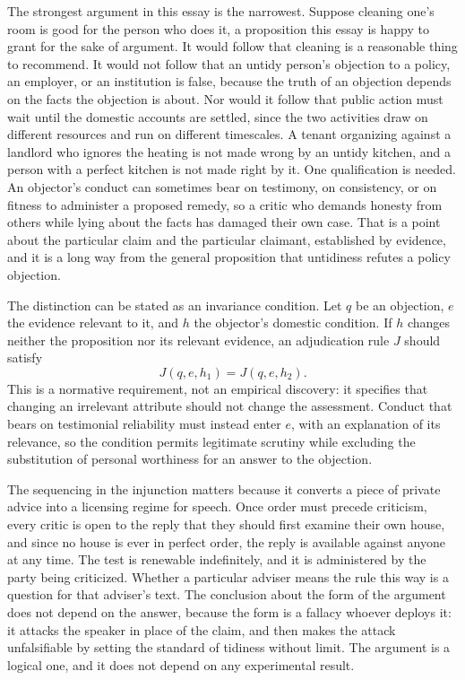 \documentclass[12pt]{article}
\begin{document}
The strongest argument in this essay is the narrowest. Suppose cleaning one's room is good for the person who does it, a proposition this essay is happy to grant for the sake of argument. It would follow that cleaning is a reasonable thing to recommend. It would not follow that an untidy person's objection to a policy, an employer, or an institution is false, because the truth of an objection depends on the facts the objection is about. Nor would it follow that public action must wait until the domestic accounts are settled, since the two activities draw on different resources and run on different timescales. A tenant organizing against a landlord who ignores the heating is not made wrong by an untidy kitchen, and a person with a perfect kitchen is not made right by it. One qualification is needed. An objector's conduct can sometimes bear on testimony, on consistency, or on fitness to administer a proposed remedy, so a critic who demands honesty from others while lying about the facts has damaged their own case. That is a point about the particular claim and the particular claimant, established by evidence, and it is a long way from the general proposition that untidiness refutes a policy objection.

The distinction can be stated as an invariance condition. Let $q$ be an objection, $e$ the evidence relevant to it, and $h$ the objector's domestic condition. If $h$ changes neither the proposition nor its relevant evidence, an adjudication rule $J$ should satisfy
\[
J(q,e,h_1)=J(q,e,h_2).
\]
This is a normative requirement, not an empirical discovery: it specifies that changing an irrelevant attribute should not change the assessment. Conduct that bears on testimonial reliability must instead enter $e$, with an explanation of its relevance, so the condition permits legitimate scrutiny while excluding the substitution of personal worthiness for an answer to the objection.

The sequencing in the injunction matters because it converts a piece of private advice into a licensing regime for speech. Once order must precede criticism, every critic is open to the reply that they should first examine their own house, and since no house is ever in perfect order, the reply is available against anyone at any time. The test is renewable indefinitely, and it is administered by the party being criticized. Whether a particular adviser means the rule this way is a question for that adviser's text. The conclusion about the form of the argument does not depend on the answer, because the form is a fallacy whoever deploys it: it attacks the speaker in place of the claim, and then makes the attack unfalsifiable by setting the standard of tidiness without limit. The argument is a logical one, and it does not depend on any experimental result.
\end{document}
